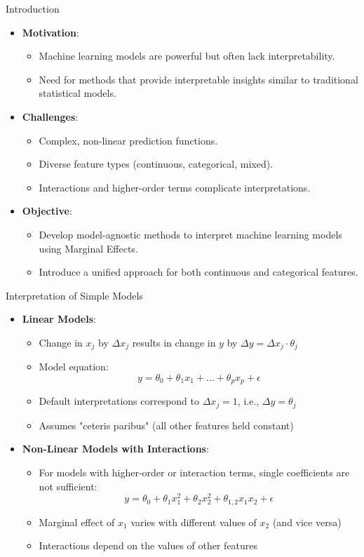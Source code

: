 \documentclass[11pt,compress,t,notes=noshow, aspectratio=169, xcolor=table]{beamer}
\begin{document}
\begin{frame}{Introduction}
\begin{itemize}
\item \textbf{Motivation}:
\begin{itemize}
  \item Machine learning models are powerful but often lack interpretability.
  \item Need for methods that provide interpretable insights similar to traditional statistical models.
\end{itemize}
\item \textbf{Challenges}:
\begin{itemize}
  \item Complex, non-linear prediction functions.
  \item Diverse feature types (continuous, categorical, mixed).
  \item Interactions and higher-order terms complicate interpretations.
\end{itemize}
\item \textbf{Objective}:
\begin{itemize}
  \item Develop model-agnostic methods to interpret machine learning models using Marginal Effects.
  \item Introduce a unified approach for both continuous and categorical features.
\end{itemize}
\end{itemize}
\end{frame}

\begin{frame}{Interpretation of Simple Models}
\begin{itemize}
\item \textbf{Linear Models}:
\begin{itemize}
\item Change in $x_j$ by $\Delta x_j$ results in change in $y$ by $\Delta y = \Delta x_j \cdot \theta_j$
\item Model equation:
\[
y = \theta_0 + \theta_1 x_1 + \dots + \theta_p x_p + \epsilon
\]
\item Default interpretations correspond to $\Delta x_j = 1$, i.e., $\Delta y = \theta_j$
\item Assumes "ceteris paribus" (all other features held constant)
\end{itemize}
\item \textbf{Non-Linear Models with Interactions}:
\begin{itemize}
\item For models with higher-order or interaction terms, single coefficients are not sufficient:
\[
y = \theta_0 + \theta_{1} x_1^2 + \theta_{2} x_2^2 + \theta_{1,2} x_1 x_2 + \epsilon
\]
\item Marginal effect of $x_1$ varies with different values of $x_2$ (and vice versa)
\item Interactions depend on the values of other features
\end{itemize}
\end{itemize}
\end{frame}
\end{document}
